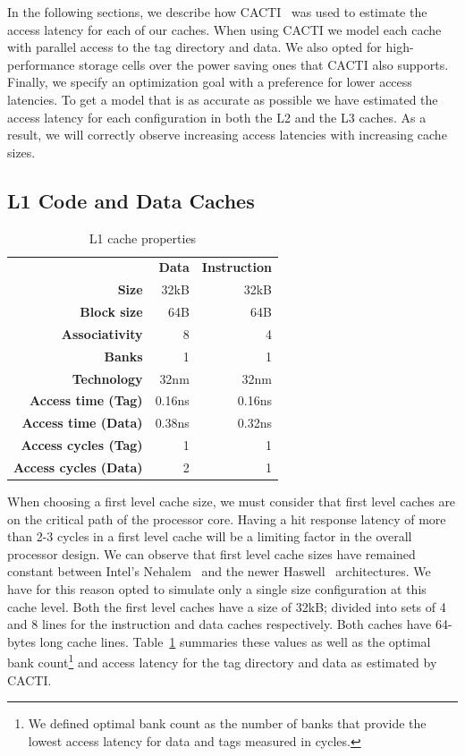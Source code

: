In the following sections, we describe how CACTI~\cite{Shivakumar2001} was used to estimate the access latency for each of our caches. 
When using CACTI we model each cache with parallel access to the tag directory and data.
We also opted for high-performance storage cells over the power saving ones that CACTI also supports.
Finally, we specify an optimization goal with a preference for lower access latencies.
To get a model that is as accurate as possible we have estimated the access latency for each configuration in both the L2 and the L3 caches.
As a result, we will correctly observe increasing access latencies with increasing cache sizes.


\subsection{L1 Code and Data Caches}

\begin{table}[ht]
\centering
\begin{tabular}{rrr}
\toprule
                          & \bf{Data}     & \bf{Instruction} \\
\bf{Size}                 & 32kB          & 32kB      \\
\bf{Block size}           & 64B           & 64B       \\
\bf{Associativity}        & 8             & 4         \\
\bf{Banks}                & 1             & 1         \\
\bf{Technology}           & 32nm          & 32nm      \\
\bf{Access time (Tag)}    & 0.16ns        & 0.16ns    \\
\bf{Access time (Data)}   & 0.38ns        & 0.32ns    \\
\bf{Access cycles (Tag)}  & 1             & 1         \\
\bf{Access cycles (Data)} & 2             & 1         \\
\bottomrule
\end{tabular}
\caption{L1 cache properties}
\label{tbl:processor_model:l1}
\end{table}

When choosing a first level cache size, we must consider that first level caches are on the critical path of the processor core.
Having a hit response latency of more than 2-3 cycles in a first level cache will be a limiting factor in the overall processor design.
We can observe that first level cache sizes have remained constant between Intel's Nehalem~\cite{Thomadakis2011} and the newer Haswell~\cite{Jain2013} architectures.
We have for this reason opted to simulate only a single size configuration at this cache level.
Both the first level caches have a size of 32kB; divided into sets of 4 and 8 lines for the instruction and data caches respectively. 
Both caches have 64-bytes long cache lines.
Table~\ref{tbl:processor_model:l1} summaries these values as well as the optimal bank count\footnote{We defined optimal bank count as the number of banks that provide the lowest access latency for data and tags measured in cycles.} and access latency for the tag directory and data as estimated by CACTI. 

